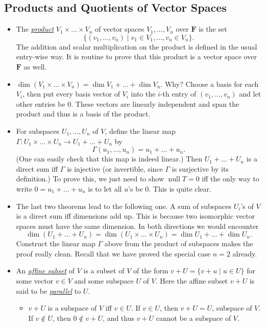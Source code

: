 \documentclass{article}
\newcommand{\df}[1]{\ul{\textit{#1}}}
\newcommand{\F}{\mathbf{F}}
\newcommand{\n}{\operatorname{null}}
\renewcommand{\d}{\dim}
\begin{document}
\subsection{Products and Quotients of Vector Spaces}
\begin{itemize}
    \item The \df{product} $V_1 \times \dots \times V_n$ of vector spaces $V_1,\dots,V_n$ over $\F$ is the set $$\{(v_1,\dots,v_n) \mid v_1 \in V_1,\dots, v_n \in V_n\}.$$ The addition and scalar multiplication on the product is defined in the usual entry-wise way. It is routine to prove that this product is a vector space over $\F$ as well.
    \item $\d (V_1\times \dots \times V_n) = \d V_1 + \dots + \d V_n$. Why? Choose a basis for each $V_i$, then put every basis vector of $V_i$ into the $i$-th entry of $(v_1,\dots,v_n)$ and let other entries be 0. These vectors are linearly independent and span the product and thus is a basis of the product.
    \item For subspaces $U_1,\dots,U_n$ of $V$, define the linear map $\Gamma: U_1 \times \dots \times U_n \to U_1 + \dots + U_n$ by $$\Gamma(u_1,\dots,u_n) = u_1+\dots+u_n.$$ (One can easily check that this map is indeed linear.) Then $U_1+\dots+U_n$ is a direct sum iff $\Gamma$ is injective (or invertible, since $\Gamma$ is surjective by its definition.) To prove this, we just need to show $\n T = {0}$ iff the only way to write $0 = u_1+\dots+u_n$ is to let all $u$'s be 0. This is quite clear.
    \item The last two theorems lead to the following one. A sum of subspaces $U_i$'s of $V$ is a direct sum iff dimensions add up. This is because two isomorphic vector spaces must have the same dimension. In both directions we would encounter $$\d (U_1+\dots+U_n) = \d (U_1 \times \dots \times U_n) = \d U_1 + \dots + \d U_n.$$
    Construct the linear map $\Gamma$ above from the product of subspaces makes the proof really clean. Recall that we have proved the special case $n=2$ already.
    \item An \df{affine subset} of $V$ is a subset of $V$ of the form $v+U = \{v+u \mid u \in U\}$ for some vector $v \in V$ and some subspace $U$ of $V$. Here the affine subset $v+U$ is said to be \df{parallel} to $U$.
    \begin{itemize}
        \item $v+U$ is a subspace of $V$ iff $v \in U$. If $v \in U$, then $v+U = U$, subspace of $V$. If $v \notin U$, then $0 \notin v+U$, and thus $v+U$ cannot be a subspace of $V$.

\end{itemize}
\end{itemize}
\end{document}
